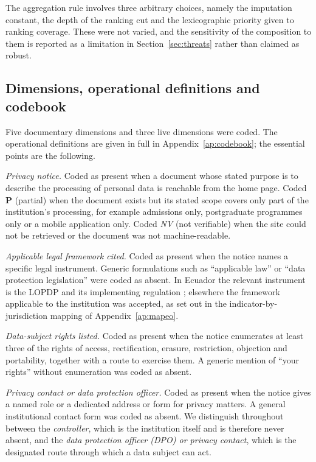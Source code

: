 \documentclass[pdflatex,sn-basic,Numbered,iicol]{sn-jnl}
\newcommand{\nv}{\textsl{\footnotesize NV}}
\theoremstyle{thmstyleone}
\theoremstyle{thmstyletwo}
\theoremstyle{thmstylethree}
\begin{document}
	The aggregation rule involves three arbitrary choices, namely the imputation constant, the depth of the ranking cut and the lexicographic priority given to ranking coverage. These were not varied, and the sensitivity of the composition to them is reported as a limitation in Section~\ref{sec:threats} rather than claimed as robust.
	
	\subsection{Dimensions, operational definitions and codebook}\label{sec:methods-codebook}
	
	Five documentary dimensions and three live dimensions were coded. The operational definitions are given in full in Appendix~\ref{ap:codebook}; the essential points are the following.
	
	\emph{Privacy notice.} Coded as present when a document whose stated purpose is to describe the processing of personal data is reachable from the home page. Coded \textbf{P} (partial) when the document exists but its stated scope covers only part of the institution's processing, for example admissions only, postgraduate programmes only or a mobile application only. Coded \nv{} (not verifiable) when the site could not be retrieved or the document was not machine-readable.
	
	\emph{Applicable legal framework cited.} Coded as present when the notice names a specific legal instrument. Generic formulations such as ``applicable law'' or ``data protection legislation'' were coded as absent. In Ecuador the relevant instrument is the LOPDP and its implementing regulation \citep{lopdp2021,reglamentolopdp2023}; elsewhere the framework applicable to the institution was accepted, as set out in the indicator-by-jurisdiction mapping of Appendix~\ref{ap:mapeo}.
	
	\emph{Data-subject rights listed.} Coded as present when the notice enumerates at least three of the rights of access, rectification, erasure, restriction, objection and portability, together with a route to exercise them. A generic mention of ``your rights'' without enumeration was coded as absent.
	
	\emph{Privacy contact or data protection officer.} Coded as present when the notice gives a named role or a dedicated address or form for privacy matters. A general institutional contact form was coded as absent. We distinguish throughout between the \emph{controller}, which is the institution itself and is therefore never absent, and the \emph{data protection officer (DPO) or privacy contact}, which is the designated route through which a data subject can act.
	
\end{document}
